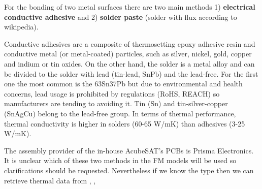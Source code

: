 \documentclass[final]{cubedoc}
\begin{document}
For the bonding of two metal surfaces there are two main methods 1) \textbf{electrical conductive adhesive} and 2) \textbf{solder paste} (solder with flux according to wikipedia). 


Conductive adhesives are a composite of thermosetting epoxy adhesive resin and conductive metal (or metal-coated) particles, such as silver, nickel, gold, copper and indium or tin oxides. On the other hand, the solder is a metal alloy and can be divided to the solder with lead (tin-lead, SnPb) and the lead-free. For the first one the most common is the 63Sn37Pb but due to environmental and health concerns, lead usage is prohibited by regulations (RoHS, REACH) so manufacturers are tending to avoiding it. Tin (Sn) and tin-silver-copper (SnAgCu) belong to the lead-free group. In terms of thermal performance, thermal conductivity is higher in solders (60-65 W/mK) than adhesives (3-25 W/mK)\cite{leadvssolde}. 

The assembly provider of the in-house AcubeSAT's PCBs is Prisma Electronics. It is unclear which of these two methods in the FM models will be used so clarifications should be requested. Nevertheless if we know the type then we can retrieve thermal data from \cite{solder},  \cite{wiki:solderalloys}, \cite{propemetalengedge}



\end{document}
